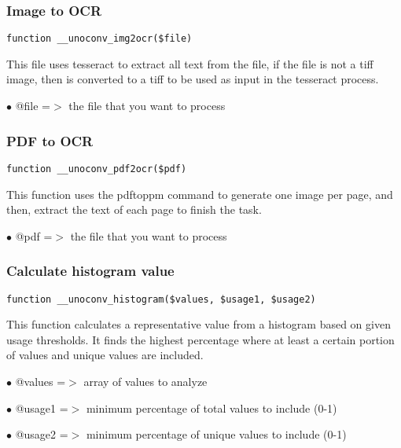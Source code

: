 \documentclass[a4paper]{article}
\begin{document}
\hypertarget{toc538}{}
\subsubsection{Image to OCR}

\begin{lstlisting}
function __unoconv_img2ocr($file)
\end{lstlisting}

This file uses tesseract to extract all text from the file, if the file
is not a tiff image, then is converted to a tiff to be used as input in
the tesseract process.

\begin{compactitem}
\item[\color{myblue}$\bullet$] @file =$>$ the file that you want to process
\end{compactitem}

\hypertarget{toc539}{}
\subsubsection{PDF to OCR}

\begin{lstlisting}
function __unoconv_pdf2ocr($pdf)
\end{lstlisting}

This function uses the pdftoppm command to generate one image per page,
and then, extract the text of each page to finish the task.

\begin{compactitem}
\item[\color{myblue}$\bullet$] @pdf =$>$ the file that you want to process
\end{compactitem}

\hypertarget{toc540}{}
\subsubsection{Calculate histogram value}

\begin{lstlisting}
function __unoconv_histogram($values, $usage1, $usage2)
\end{lstlisting}

This function calculates a representative value from a histogram based on given usage thresholds.
It finds the highest percentage where at least a certain portion of values and unique values are included.

\begin{compactitem}
\item[\color{myblue}$\bullet$] @values =$>$ array of values to analyze
\item[\color{myblue}$\bullet$] @usage1 =$>$ minimum percentage of total values to include (0-1)
\item[\color{myblue}$\bullet$] @usage2 =$>$ minimum percentage of unique values to include (0-1)
\end{compactitem}
\end{document}
